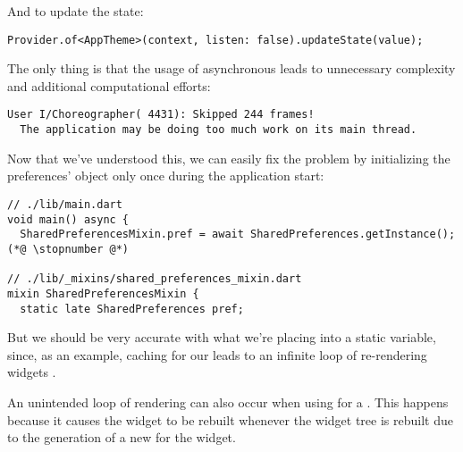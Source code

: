 \noindent And to update the state:

\begin{lstlisting}
Provider.of<AppTheme>(context, listen: false).updateState(value);
\end{lstlisting}

\noindent The only thing is that the usage of asynchronous  leads to unnecessary complexity and 
additional computational efforts:

\begin{lstlisting}[language=terminal]
User I/Choreographer( 4431): Skipped 244 frames!
  The application may be doing too much work on its main thread.
\end{lstlisting}

\noindent Now that we've understood this, we can easily fix the problem by initializing the preferences' object only 
once during the application start:

\begin{lstlisting}
// ./lib/main.dart
void main() async {
  SharedPreferencesMixin.pref = await SharedPreferences.getInstance();(*@ \stopnumber @*)

// ./lib/_mixins/shared_preferences_mixin.dart
mixin SharedPreferencesMixin {
  static late SharedPreferences pref;
\end{lstlisting}

\noindent But we should be very accurate with what we're placing into a static variable, since, as an example, 
caching  for our  leads to an infinite loop of re-rendering widgets .

An unintended loop of rendering can also occur when using  for a . This happens 
because it causes the widget to be rebuilt whenever the widget tree is rebuilt due to the generation of a new 
 for the widget.
